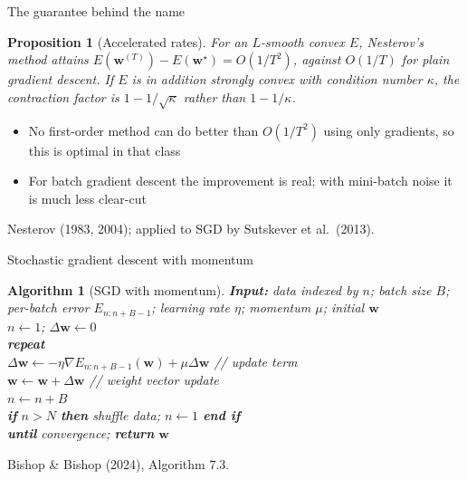 \documentclass[aspectratio=169, 11pt]{beamer}
\newtheorem{propx}[theorem]{Proposition}
\newtheorem{algox}[theorem]{Algorithm}
\newcommand{\srcline}[1]{%
  \par\vspace{0.25em}%
  {\scriptsize\color{mcMuted}\hfill #1\par}}
\newcommand{\src}[3]{}      %
\begin{document}
\begin{frame}{The guarantee behind the name}
  \src{nesterov2004}{chapter}{2}
  \src{bishop2024}{section}{7.3.1}
  \vspace{-0.2em}
  \begin{propx}[Accelerated rates]\label{th:nest}
    \small
    For an $L$-smooth convex $E$, Nesterov's method attains
    $E(\mathbf{w}^{(T)}) - E(\mathbf{w}^\star) = O(1/T^{2})$, against $O(1/T)$ for plain
    gradient descent. If $E$ is in addition strongly convex with
    condition number $\kappa$, the contraction factor is
    $1 - 1/\sqrt{\kappa}$ rather than $1 - 1/\kappa$.
  \end{propx}
  \vspace{0.4em}
  \begin{itemize}\itemsep0.4em
    \item No first-order method can do better than $O(1/T^2)$ using only
          gradients, so this is optimal in that class
    \item For \alert{batch} gradient descent the improvement is real;
          with mini-batch noise it is much less clear-cut
  \end{itemize}
  \srcline{Nesterov (1983, 2004); applied to SGD by Sutskever et
  al.~(2013).}
\end{frame}

\begin{frame}{Stochastic gradient descent with momentum}
  \src{bishop2024}{algorithm}{7.3}
  \src{bishop2024}{section}{7.3.1}
  \vspace{0.2em}
  \begin{algox}[SGD with momentum]\label{th:algmom}
    \small
    \textbf{Input:} data indexed by $n$; batch size $B$; per-batch error
    $E_{n:n+B-1}$; learning rate $\eta$; momentum $\mu$; initial $\mathbf{w}$\\[0.35em]
    $n \leftarrow 1$; \quad $\Delta \mathbf{w} \leftarrow 0$\\
    \textbf{repeat}\\
    \hspace{1.4em} $\Delta \mathbf{w} \leftarrow -\eta \nabla E_{n:n+B-1}(\mathbf{w})
      + \mu \Delta \mathbf{w}$ \hfill \textcolor{mcMuted}{// update term}\\
    \hspace{1.4em} $\mathbf{w} \leftarrow \mathbf{w} + \Delta \mathbf{w}$
      \hfill \textcolor{mcMuted}{// weight vector update}\\
    \hspace{1.4em} $n \leftarrow n + B$\\
    \hspace{1.4em} \textbf{if} $n > N$ \textbf{then}
      \; shuffle data; \; $n \leftarrow 1$ \; \textbf{end if}\\
    \textbf{until} convergence; \quad \textbf{return} $\mathbf{w}$
  \end{algox}
  \srcline{Bishop \& Bishop (2024), Algorithm 7.3.}
\end{frame}
\end{document}
